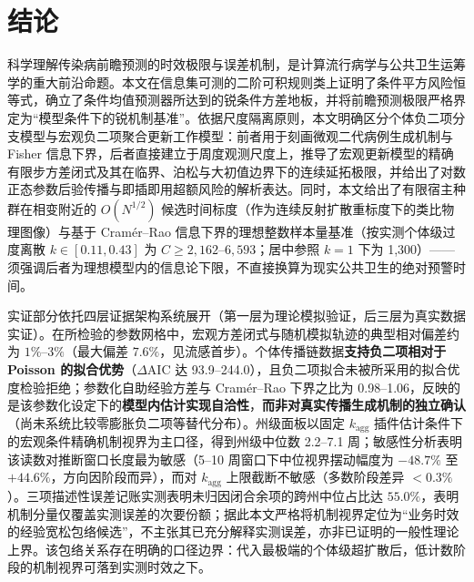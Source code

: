 \documentclass[10pt,a4paper]{article}
\theoremstyle{plain}
\theoremstyle{definition}
\begin{document}
\section{结论}\label{sec:conclusion}

科学理解传染病前瞻预测的时效极限与误差机制，是计算流行病学与公共卫生运筹学的重大前沿命题。本文在信息集可测的二阶可积规则类上证明了条件平方风险恒等式，确立了条件均值预测器所达到的锐条件方差地板，并将前瞻预测极限严格界定为“模型条件下的锐机制基准”。依据尺度隔离原则，本文明确区分个体负二项分支模型与宏观负二项聚合更新工作模型：前者用于刻画微观二代病例生成机制与 Fisher 信息下界，后者直接建立于周度观测尺度上，推导了宏观更新模型的精确有限步方差闭式及其在临界、泊松与大初值边界下的连续延拓极限，并给出了对数正态参数后验传播与即插即用超额风险的解析表达。同时，本文给出了有限宿主种群在相变附近的 $O(N^{1/2})$ 候选时间标度（作为连续反射扩散重标度下的类比物理图像）与基于 Cramér--Rao 信息下界的理想整数样本量基准（按实测个体级过度离散 $k \in [0.11, 0.43]$ 为 $C \ge 2{,}162$--$6{,}593$；居中参照 $k=1$ 下为 1,300）——须强调后者为理想模型内的信息论下限，不直接换算为现实公共卫生的绝对预警时间。

实证部分依托四层证据架构系统展开（第一层为理论模拟验证，后三层为真实数据实证）。在所检验的参数网格中，宏观方差闭式与随机模拟轨迹的典型相对偏差约为 $1\%$--$3\%$（最大偏差 $7.6\%$，见流感首步）。个体传播链数据\textbf{支持负二项相对于 Poisson 的拟合优势}（$\Delta\text{AIC}$ 达 93.9--244.0），且负二项拟合未被所采用的拟合优度检验拒绝；参数化自助经验方差与 Cramér--Rao 下界之比为 0.98--1.06，反映的是该参数化设定下的\textbf{模型内估计实现自洽性}，\textbf{而非对真实传播生成机制的独立确认}（尚未系统比较零膨胀负二项等替代分布）。州级面板以固定 $k_{\text{agg}}$ 插件估计条件下的宏观条件精确机制视界为主口径，得到州级中位数 2.2--7.1 周；敏感性分析表明该读数对推断窗口长度最为敏感（5--10 周窗口下中位视界摆动幅度为 $-48.7\%$ 至 $+44.6\%$，方向因阶段而异），而对 $k_{\text{agg}}$ 上限截断不敏感（多数阶段差异 $<0.3\%$）。三项描述性误差记账实测表明未归因闭合余项的跨州中位占比达 $55.0\%$，表明机制分量仅覆盖实测误差的次要份额；据此本文严格将机制视界定位为“业务时效的经验宽松包络候选”，不主张其已充分解释实测误差，亦非已证明的一般性理论上界。该包络关系存在明确的口径边界：代入最极端的个体级超扩散后，低计数阶段的机制视界可落到实测时效之下。
\end{document}
